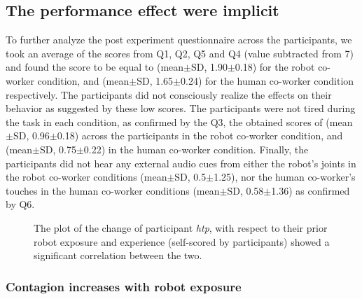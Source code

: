 \subsection{The performance effect were implicit} \label{questionnaire}

To further analyze the post experiment questionnaire across the participants, we took an average of the scores from Q1, Q2, Q5 and Q4 (value subtracted from 7) and found the score to be equal to (mean$\pm$SD, 1.90$\pm$0.18) for the robot co-worker condition, and (mean$\pm$SD, 1.65$\pm$0.24) for the human co-worker condition respectively. The participants did not consciously realize the effects on their behavior as suggested by these low scores. The participants were not tired during the task in each condition, as confirmed by the Q3, the obtained scores of (mean$\pm$SD, 0.96$\pm$0.18) across the participants in the robot co-worker condition, and (mean$\pm$SD, 0.75$\pm$0.22) in the human co-worker condition. Finally, the participants did not hear any external audio cues from either the robot's joints in the robot co-worker conditions (mean$\pm$SD, 0.5$\pm$1.25), nor the human co-worker's touches in the human co-worker conditions (mean$\pm$SD, 0.58$\pm$1.36) as confirmed by Q6.


\begin{figure}[hptb]
	\caption{The plot of the change of participant {\it htp}, with respect to their prior robot exposure and experience (self-scored by participants) showed a significant correlation between the two.}
	\label{fig:corelation}
\end{figure}


\subsubsection{Contagion increases with robot exposure}

